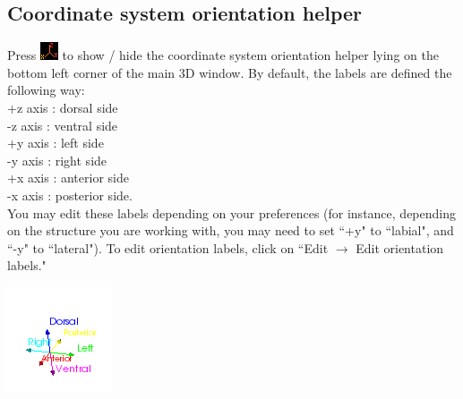 \subsection{Coordinate system orientation helper}
\begin{minipage}{0.7\textwidth}
Press \includegraphics[scale=0.7]{images/06/camera/orientation_helper.png} to show / hide the coordinate system orientation helper lying on the bottom left corner of the main 3D window. By default, the labels are defined
the following way:\\
+z axis : dorsal side\\
-z axis : ventral side\\
+y axis : left side\\
-y axis : right side\\
+x axis : anterior side\\
-x axis : posterior side.\\
You may edit these labels depending on your preferences (for instance,
depending on the structure you are working with, you may need to set ``+y" to ``labial", and ``-y" to
``lateral"). To edit orientation labels, click on ``Edit $\rightarrow$ Edit orientation labels."
\end{minipage}    
\begin{minipage}{0.3\textwidth}\centering
 \includegraphics[scale=0.7]{images/06/camera/orientation_helper_view.png}
 \end{minipage}   


